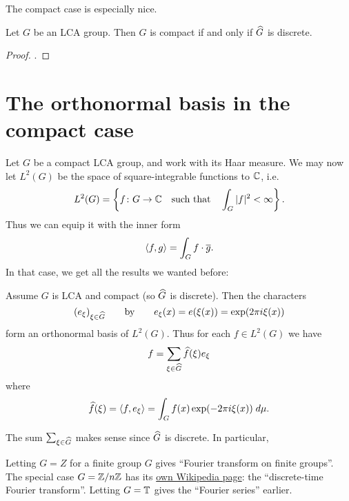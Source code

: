 The compact case is especially nice.
\begin{proposition}
	Let $G$ be an LCA group.
	Then $G$ is compact if and only if $\widehat G$ is discrete.
\end{proposition}
\begin{proof}
	.
\end{proof}

\section{The orthonormal basis in the compact case}
Let $G$ be a compact LCA group,
and work with its Haar measure.
We may now let $L^2(G)$ be the space of
square-integrable functions to $\mathbb C$, i.e.
\[ L^2(G) = \left\{ f \colon G \to \mathbb C
	\quad\text{such that}\quad \int_G |f|^2 < \infty \right\}. \]
Thus we can equip it with the inner form
\[ \left< f,g \right> = \int_G f \cdot \overline{g}. \]
In that case, we get all the results we wanted before:
\begin{theorem}
	\label{thm:god}
	Assume $G$ is LCA and compact (so $\widehat G$ is discrete).
	Then the characters
	\[ (e_\xi)_{\xi \in \widehat G}
		\qquad\text{by}\qquad e_\xi(x) = e(\xi(x)) = \exp(2\pi i \xi(x)) \]
	form an orthonormal basis of $L^2(G)$.
	Thus for each $f \in L^2(G)$ we have
	\[ f = \sum_{\xi \in \widehat G} \widehat f(\xi) e_\xi \]
	where
	\[ \widehat f(\xi) = \left< f, e_\xi \right>
		= \int_G f(x) \exp(-2\pi i \xi(x)) \; d\mu. \]
\end{theorem}
The sum $\sum_{\xi \in \widehat G}$ makes sense since $\widehat G$ is discrete.
In particular,
\begin{itemize}
	\ii Letting $G = Z$ for a finite group $G$
	gives ``Fourier transform on finite groups''.
	\ii The special case $G = \mathbb Z/n\mathbb Z$ has its
	\href{https://en.wikipedia.org/wiki/Discrete_Fourier_transform#Definition}%
	{own Wikipedia page}: the ``discrete-time Fourier transform''.
	\ii Letting $G = \mathbb T$ gives the ``Fourier series'' earlier.
\end{itemize}

